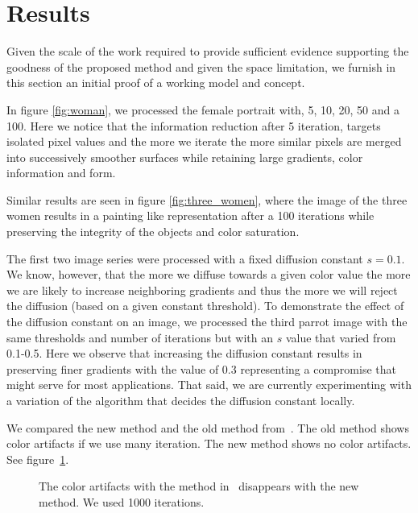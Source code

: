 \section{Results}
Given the scale of the work required to provide sufficient evidence supporting the goodness of the proposed method and given the space limitation, we furnish in this section an initial proof of a working model and concept.

In figure \ref{fig:woman}, we processed the female portrait with, 5, 10, 20, 50 and a 100. Here we notice that the information reduction after 5 iteration, targets isolated pixel values and the more we iterate the more similar pixels are merged into successively smoother surfaces while retaining large gradients, color information and form. 

Similar results are seen in figure \ref{fig:three_women}, where the image of the three women results in a painting like representation after a 100 iterations while preserving the integrity of the objects and color saturation.

The first two image series were processed with a fixed diffusion constant $s=0.1$. We know, however, that the more we diffuse towards a given color value the more we are likely to increase neighboring gradients and thus the more we will reject the diffusion (based on a given constant threshold). To demonstrate the effect of the diffusion constant on an image, we processed the third parrot image with the same thresholds and number of iterations but with an $s$ value that varied from 0.1-0.5. Here we observe that increasing the diffusion constant results in preserving finer gradients with the value of 0.3 representing a compromise that might serve for most applications. That said, we are currently experimenting with a variation of the algorithm that decides the diffusion constant locally.

We compared the new method and the old method from~\cite{AlsamRivertz11}. The old method shows color artifacts if we use many iteration. The new method shows no color artifacts.
See figure~\ref{fig:comparison}.

  
%
\begin{figure}
	\centering
	\caption{The color artifacts with the method in~\cite{AlsamRivertz11} disappears with the new method. We used 1000 iterations.}
	\label{fig:comparison}
\end{figure}

